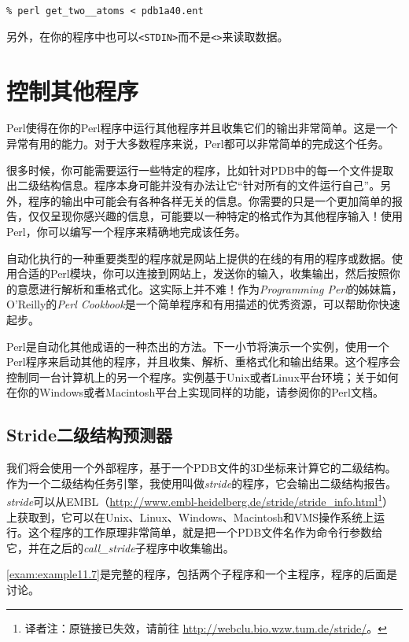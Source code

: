 \begin{lstlisting}
% perl get_two__atoms < pdb1a40.ent 
\end{lstlisting}

另外，在你的程序中也可以\verb|<STDIN>|而不是\verb|<>|来读取数据。

\section{控制其他程序}
Perl使得在你的Perl程序中运行其他程序并且收集它们的输出非常简单。这是一个异常有用的能力。对于大多数程序来说，Perl都可以非常简单的完成这个任务。

很多时候，你可能需要运行一些特定的程序，比如针对PDB中的每一个文件提取出二级结构信息。程序本身可能并没有办法让它“针对所有的文件运行自己”。另外，程序的输出中可能会有各种各样无关的信息。你需要的只是一个更加简单的报告，仅仅呈现你感兴趣的信息，可能要以一种特定的格式作为其他程序输入！使用Perl，你可以编写一个程序来精确地完成该任务。

自动化执行的一种重要类型的程序就是网站上提供的在线的有用的程序或数据。使用合适的Perl模块，你可以连接到网站上，发送你的输入，收集输出，然后按照你的意愿进行解析和重格式化。这实际上并不难！作为\textit{Programming Perl}的姊妹篇，O'Reilly的\textit{Perl Cookbook}是一个简单程序和有用描述的优秀资源，可以帮助你快速起步。

Perl是自动化其他成语的一种杰出的方法。下一小节将演示一个实例，使用一个Perl程序来启动其他的程序，并且收集、解析、重格式化和输出结果。这个程序会控制同一台计算机上的另一个程序。实例基于Unix或者Linux平台环境；关于如何在你的Windows或者Macintosh平台上实现同样的功能，请参阅你的Perl文档。

\subsection{Stride二级结构预测器}
我们将会使用一个外部程序，基于一个PDB文件的3D坐标来计算它的二级结构。作为一个二级结构任务引擎，我使用叫做\textit{stride}的程序，它会输出二级结构报告。\textit{stride}可以从EMBL（\href{http://www.embl-heidelberg.de/stride/stride\_info.html}{http://www.embl-heidelberg.de/stride/stride\_info.html}\footnote{译者注：原链接已失效，请前往 \href{http://webclu.bio.wzw.tum.de/stride/}{http://webclu.bio.wzw.tum.de/stride/}。}）上获取到，它可以在Unix、Linux、Windows、Macintosh和VMS操作系统上运行。这个程序的工作原理非常简单，就是把一个PDB文件名作为命令行参数给它，并在之后的\textit{call\_stride}子程序中收集输出。

\autoref{exam:example11.7}是完整的程序，包括两个子程序和一个主程序，程序的后面是讨论。


